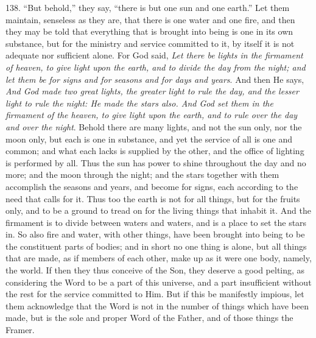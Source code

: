 138. ``But behold,'' they say, ``there
is but one sun and one earth.'' Let them maintain, senseless as they
are, that there is one water and one fire, and then they may be told
that everything that is brought into being is one in its own
substance, but for the ministry and service committed to it, by itself
it is not adequate nor sufficient alone. For God said, \emph{Let there be
lights in the firmament of heaven, to give light upon the earth, and
to divide the day from the night; and let them be for signs and for
seasons and for days and years}. And then He says, \emph{And God made
two great lights, the greater light to rule the day, and the lesser
light to rule the night: He made the stars also. And God set them in
the firmament of the heaven, to give light upon the earth, and to rule
over the day and over the night}. Behold there are many lights, and
not the sun only, nor the moon only, but each is one in substance, and
yet the service of all is one and common; and what each lacks is
supplied by the other, and the office of lighting is performed by all.
Thus the sun has power to shine throughout the day and no more; and
the moon through the night; and the stars together with them
accomplish the seasons and years, and become for signs, each according
to the need that calls for it. Thus too the earth is not for all
things, but for the fruits only, and to be a ground to tread on for
the living things that inhabit it. And the firmament is to divide
between waters and waters, and is a place to set the stars in. So also
fire and water, with other things, have been brought into being to be
the constituent parts of bodies; and in short no one thing is
alone, but all things that are made, as if members of each other, make
up as it were one body, namely, the world. If then they thus conceive
of the Son, they deserve a good pelting, as considering the Word to be
a part of this universe, and a part insufficient without the rest for
the service committed to Him. But if this be manifestly impious, let
them acknowledge that the Word is not in the number of things which
have been made, but is the sole and proper Word of the Father, and of
those things the Framer.

